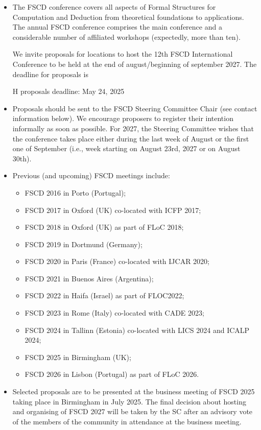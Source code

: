 \documentclass[prodmode,acmtecs]{acmsmall} %
\begin{document}
\begin{itemize}\item  The FSCD conference covers all aspects of Formal Structures for Computation and Deduction from theoretical foundations to applications.  The annual FSCD conference comprises the main conference and a considerable number of affiliated workshops (expectedly, more than ten). 
 
  We invite proposals for locations to host the 12th FSCD International Conference to be held at the end of august/beginning of september 2027. The deadline for proposals is  
 
H proposals deadline: May 24, 2025 
 
\item  Proposals should be sent to the FSCD Steering Committee Chair (see contact information below). We encourage proposers to register their intention informally as soon as possible. For 2027, the Steering Committee wishes that the conference takes place either during the last week of August or the first one of September (i.e., week starting on August 23rd, 2027 or on August 30th).  
 
\item  Previous (and upcoming) FSCD meetings include: 
 
\begin{itemize}\item  FSCD 2016 in Porto (Portugal);
\item  FSCD 2017 in Oxford (UK) co-located with ICFP 2017;
\item  FSCD 2018 in Oxford (UK) as part of FLoC 2018;
\item  FSCD 2019 in Dortmund (Germany);
\item  FSCD 2020 in Paris (France) co-located with IJCAR 2020;
\item  FSCD 2021 in Buenos Aires (Argentina);
\item  FSCD 2022 in Haifa (Israel) as part of FLOC2022;
\item  FSCD 2023 in Rome (Italy) co-located with CADE 2023;
\item  FSCD 2024 in Tallinn (Estonia) co-located with LICS 2024 and ICALP 2024;
\item  FSCD 2025 in Birmingham (UK);
\item  FSCD 2026 in Lisbon (Portugal) as part of FLoC 2026.
\end{itemize} 
\item  Selected proposals are to be presented at the business meeting of FSCD 2025 taking place in Birmingham in July 2025. The final decision about hosting and organising of FSCD 2027 will be taken by the SC after an advisory vote of the members of the community in attendance at the business meeting.  
 

\end{itemize}
\end{document}
